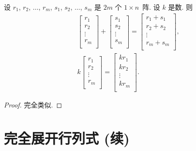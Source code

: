 \documentclass[%
    UTF8,%
    fontset=none,%
    punct=kaiming,%
    zihao=-4,%
    a4paper,%
    oneside,%
]{ctexbook}
\begin{document}
\begin{theorem}
    设
    \(r_1\), \(r_2\), \(\dots\), \(r_m\),
    \(s_1\), \(s_2\), \(\dots\), \(s_m\)
    是 \(2m\) 个 \(1 \times n\)~阵.
    设 \(k\) 是数.
    则
    \begin{align*}
         & \begin{bmatrix}
               r_1    \\
               r_2    \\
               \vdots \\
               r_m    \\
           \end{bmatrix}
        + \begin{bmatrix}
              s_1    \\
              s_2    \\
              \vdots \\
              s_m    \\
          \end{bmatrix}
        = \begin{bmatrix}
              r_1 + s_1 \\
              r_2 + s_2 \\
              \vdots    \\
              r_m + s_m \\
          \end{bmatrix},   \\
         & k\begin{bmatrix}
                r_1    \\
                r_2    \\
                \vdots \\
                r_m    \\
            \end{bmatrix}
        = \begin{bmatrix}
              kr_1   \\
              kr_2   \\
              \vdots \\
              kr_m   \\
          \end{bmatrix}.
    \end{align*}
\end{theorem}

\begin{proof}
    完全类似.
\end{proof}

\section{完全展开行列式 (续)}
\end{document}
